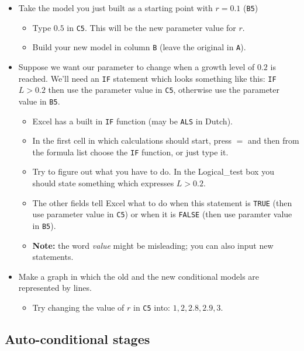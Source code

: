 \documentclass[]{book}
\providecommand{\tightlist}{%
  \setlength{\itemsep}{0pt}\setlength{\parskip}{0pt}}
\begin{document}
\begin{itemize}
\tightlist
\item
  Take the model you just built as a starting point with \(r = 0.1\)
  (\texttt{B5})

  \begin{itemize}
  \tightlist
  \item
    Type \(0.5\) in \texttt{C5}. This will be the new parameter value
    for \(r\).
  \item
    Build your new model in column \texttt{B} (leave the original in
    \texttt{A}).
  \end{itemize}
\item
  Suppose we want our parameter to change when a growth level of \(0.2\)
  is reached. We'll need an \texttt{IF} statement which looks something
  like this: \texttt{IF} \(L > 0.2\) then use the parameter value in
  \texttt{C5}, otherwise use the parameter value in \texttt{B5}.

  \begin{itemize}
  \tightlist
  \item
    Excel has a built in \texttt{IF} function (may be \texttt{ALS} in
    Dutch).
  \item
    In the first cell in which calculations should start, press \(=\)
    and then from the formula list choose the \texttt{IF} function, or
    just type it.
  \item
    Try to figure out what you have to do. In the Logical\_test box you
    should state something which expresses \(L > 0.2\).
  \item
    The other fields tell Excel what to do when this statement is
    \texttt{TRUE} (then use parameter value in \texttt{C5}) or when it
    is \texttt{FALSE} (then use paramter value in \texttt{B5}).
  \item
    \textbf{Note:} the word \emph{value} might be misleading; you can
    also input new statements.
  \end{itemize}
\item
  Make a graph in which the old and the new conditional models are
  represented by lines.

  \begin{itemize}
  \tightlist
  \item
    Try changing the value of \(r\) in \texttt{C5} into:
    \(1, 2, 2.8, 2.9, 3\).
  \end{itemize}
\end{itemize}

\subsection*{Auto-conditional stages}\label{auto-conditional-stages}
\end{document}
